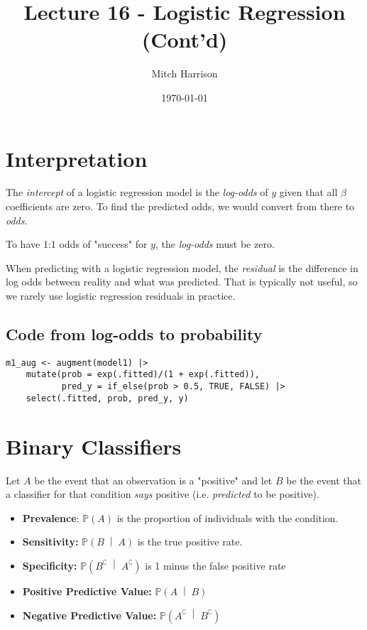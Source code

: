 \documentclass[titlepage, 12pt, leqno]{article}
\title{\Huge{Lecture 16 - Logistic Regression (Cont'd)}}
\author{\large{Mitch Harrison}}
\date{\today}
\begin{document}
\setlength{\parskip}{1\baselineskip}
\setlength{\parindent}{15pt}
\maketitle
\tableofcontents
\newpage


\section{Interpretation}

The \textit{intercept} of a logistic regression model is the \textit{log-odds} of
$y$ given that all $\beta$ coefficients are zero. To find the predicted odds, we 
would convert from there to \textit{odds}. 

\begin{note}
    To have 1:1 odds of "success" for $y$, the \textit{log-odds} must be zero.
\end{note}

When predicting with a logistic regression model, the \textit{residual} is the
difference in log odds between reality and what was predicted. That is typically
not useful, so we rarely use logistic regression residuals in practice.

\subsection{Code from log-odds to probability}
\begin{verbatim}
m1_aug <- augment(model1) |>
    mutate(prob = exp(.fitted)/(1 + exp(.fitted)),
           pred_y = if_else(prob > 0.5, TRUE, FALSE) |>
    select(.fitted, prob, pred_y, y)
\end{verbatim}

\pagebreak
\section{Binary Classifiers}
Let $A$ be the event that an observation is a "positive" and let $B$ be the event
that a classifier for that condition \textit{says} positive (i.e. 
\textit{predicted} to be positive).

\begin{itemize}
    \item \textbf{Prevalence}: $\mathbb{P}(A)$ is the proportion of individuals
        with the condition.
    \item \textbf{Sensitivity:} $ \mathbb{P}\left(B \;\middle|\; A\right) $ is
        the true positive rate.
    \item \textbf{Specificity:} $ \mathbb{P}\left(B^\complement \;\middle|\; 
        A^\complement \right) $ is 1 minus the false positive rate
    \item \textbf{Positive Predictive Value:} $ \mathbb{P}\left(A \;\middle|\; 
        B\right) $
    \item \textbf{Negative Predictive Value:} $ \mathbb{P}\left(A^\complement 
        \;\middle|\; B^\complement \right) $
\end{itemize}
\end{document}
